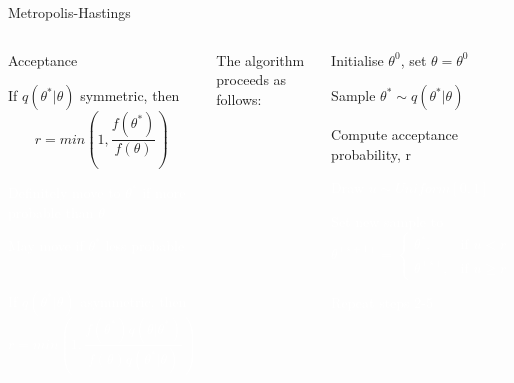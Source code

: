 \documentclass[compress]{beamer}
\begin{document}
\begin{frame}[label=sec-7-5]{Metropolis-Hastings}
\begin{columns}[c] 
\begin{block}{Acceptance}
\begin{itemize}
\item If $q(\theta^*|\theta)$ symmetric, then 
$$ r = min \left( 1,\dfrac{f(\theta^*)}{f(\theta)} \right)$$ 
\textcolor{white}{
\item[\color{white}] Definitely move to $\theta^*$ if more probable than $\theta$ 
\item[\color{white}] May move if $\theta^*$ less probable \\~\\
\item[\color{white}] If $q(\theta^*|\theta)$ asymmetric, then $$ r = min \left( 1,\dfrac{f(\theta^*)q(\theta|\theta^*)}{f(\theta)q(\theta^*|\theta)} \right)$$
}
\end{itemize}
\end{block}

The algorithm proceeds as follows:\\
\begin{enumerate}
\item Initialise $\theta^{0}$, set $\theta = \theta^{0}$
\item Sample $\theta^* \sim q(\theta^*|\theta)$
\item Compute acceptance probability, r
\textcolor{white}{
\item[\color{white}] Draw $u \sim Uniform[0,1]$
\item[\color{white}] Set new sample to 
\[
 \theta^{(s+1)} = 
\begin{cases}
    \theta^*, & \text{if } u < r\\
    \theta^{(s)}, & \text{if } u \geqslant r
\end{cases}
\]
\item[\color{white}] Repeat steps 2-5
}
\end{enumerate}
\end{columns}
\end{frame}
\end{document}
